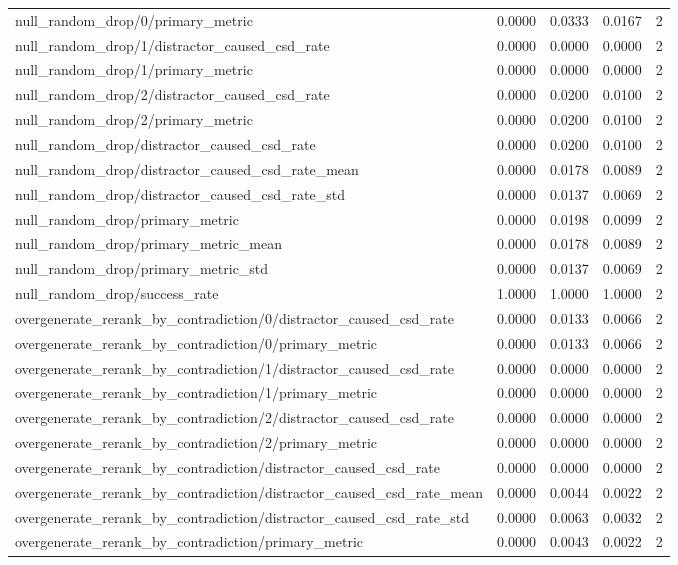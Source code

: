 \begin{table}[h]
\begin{tabular}{lrrrr}
null_random_drop/0/primary_metric & 0.0000 & 0.0333 & 0.0167 & 2 \\
null_random_drop/1/distractor_caused_csd_rate & 0.0000 & 0.0000 & 0.0000 & 2 \\
null_random_drop/1/primary_metric & 0.0000 & 0.0000 & 0.0000 & 2 \\
null_random_drop/2/distractor_caused_csd_rate & 0.0000 & 0.0200 & 0.0100 & 2 \\
null_random_drop/2/primary_metric & 0.0000 & 0.0200 & 0.0100 & 2 \\
null_random_drop/distractor_caused_csd_rate & 0.0000 & 0.0200 & 0.0100 & 2 \\
null_random_drop/distractor_caused_csd_rate_mean & 0.0000 & 0.0178 & 0.0089 & 2 \\
null_random_drop/distractor_caused_csd_rate_std & 0.0000 & 0.0137 & 0.0069 & 2 \\
null_random_drop/primary_metric & 0.0000 & 0.0198 & 0.0099 & 2 \\
null_random_drop/primary_metric_mean & 0.0000 & 0.0178 & 0.0089 & 2 \\
null_random_drop/primary_metric_std & 0.0000 & 0.0137 & 0.0069 & 2 \\
null_random_drop/success_rate & 1.0000 & 1.0000 & 1.0000 & 2 \\
overgenerate_rerank_by_contradiction/0/distractor_caused_csd_rate & 0.0000 & 0.0133 & 0.0066 & 2 \\
overgenerate_rerank_by_contradiction/0/primary_metric & 0.0000 & 0.0133 & 0.0066 & 2 \\
overgenerate_rerank_by_contradiction/1/distractor_caused_csd_rate & 0.0000 & 0.0000 & 0.0000 & 2 \\
overgenerate_rerank_by_contradiction/1/primary_metric & 0.0000 & 0.0000 & 0.0000 & 2 \\
overgenerate_rerank_by_contradiction/2/distractor_caused_csd_rate & 0.0000 & 0.0000 & 0.0000 & 2 \\
overgenerate_rerank_by_contradiction/2/primary_metric & 0.0000 & 0.0000 & 0.0000 & 2 \\
overgenerate_rerank_by_contradiction/distractor_caused_csd_rate & 0.0000 & 0.0000 & 0.0000 & 2 \\
overgenerate_rerank_by_contradiction/distractor_caused_csd_rate_mean & 0.0000 & 0.0044 & 0.0022 & 2 \\
overgenerate_rerank_by_contradiction/distractor_caused_csd_rate_std & 0.0000 & 0.0063 & 0.0032 & 2 \\
overgenerate_rerank_by_contradiction/primary_metric & 0.0000 & 0.0043 & 0.0022 & 2 \\

\end{tabular}
\end{table}
